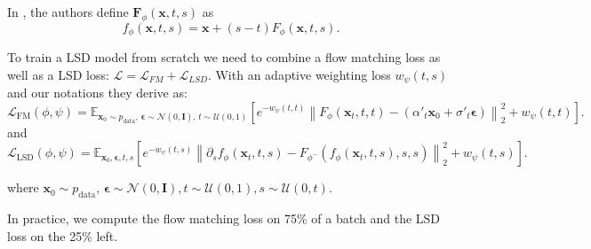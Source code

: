 In \citep{lsd}, the authors define $\mathbf{F}_\phi(\mathbf{x}, t, s)$ as 
\begin{equation}
    f_\phi(\mathbf{x}, t, s) = \mathbf{x} + (s - t) F_\phi(\mathbf{x}, t, s).
\end{equation}

To train a LSD model from scratch we need to combine a flow matching loss as well as a LSD loss: $\mathcal{L} = \mathcal{L}_{FM} + \mathcal{L}_{LSD}$. With an adaptive weighting loss $w_\psi(t, s)$ and our notations they derive as:
\begin{equation}
    \mathcal{L}_{\text{FM}}(\phi, \psi) = \mathbb{E}_{\mathbf{x}_0 \sim p_{\text{data}},\, \bm{\epsilon} \sim \mathcal{N}(0, \mathbf{I}),\, t \sim \mathcal{U}(0, 1)}
\left[ e^{-w_\psi(t, t)} \left\| F_\phi(\mathbf{x}_t, t, t) - \left( \alpha'_t \mathbf{x}_0 + \sigma'_t \bm{\epsilon} \right) \right\|_2^2 + w_\psi(t, t)\right].
\end{equation}
and
\begin{equation}
    \mathcal{L}_{\text{LSD}}(\phi, \psi) = \mathbb{E}_{\mathbf{x}_0, \bm{\epsilon}, t,s}
\left[ e^{-w_\psi(t, s)} \left\| \partial_sf_\phi(\mathbf{x}_t, t, s) - F_{\phi^-}(f_\phi(\mathbf{x}_t, t, s), s, s) \right\|_2^2 + w_\psi(t, s)\right].
\end{equation}

 where $\mathbf{x}_0 \sim p_{\text{data}},\, \bm{\epsilon} \sim \mathcal{N}(0, \mathbf{I}), t \sim \mathcal{U}(0, 1), s \sim \mathcal{U}(0, t)$.

 In practice, we compute the flow matching loss on 75\% of a batch and the LSD loss on the 25\% left. 


